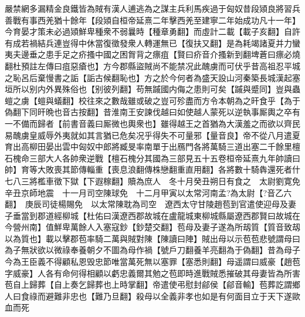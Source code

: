 嚴禁網多漏精金良鐵皆為賊有漢人逋逃為之謀主兵利馬疾過于匈奴昔段熲良將習兵善戰有事西羌猶十餘年【段熲自桓帝延熹二年擊西羌至建寧二年始成功凡十一年】今育晏才策未必過熲鮮卑種衆不弱曩時【種章勇翻】而虛計二載【載子亥翻】自許有成若禍結兵連豈得中休當復徵發衆人轉運無已【復扶又翻】是為耗竭諸夏并力蠻夷夫邊垂之患手足之疥搔中國之困胷背之瘭疽【賢曰疥音介搔新到翻埤蒼曰瘭必燒翻杜預註左傳曰疽惡瘡也】方今郡縣盜賊尚不能禁况此醜虜而可伏乎昔高祖忍平城之恥呂后棄慢書之詬【詬古候翻恥也】方之於今何者為盛天設山河秦築長城漢起塞垣所以别内外異殊俗也【别彼列翻】苟無䠞國内侮之患則可矣【䠞與蹙同】豈與蟲螘之虜【螘與蟻翻】校往來之數哉雖或破之豈可殄盡而方令本朝為之旰食乎【為于偽翻下同旰晩也音古按翻】昔淮南王安諫伐越曰如使越人蒙死以逆執事厮輿之卒有一不備而歸者【前書音義曰厮微也輿衆也】雖得越王之首猶為大漢羞之而欲以齊民易醜虜皇威辱外夷就如其言猶已危矣况乎得失不可量邪【量音良】帝不從八月遣夏育出高柳田晏出雲中匈奴中郎將臧旻率南單于出鴈門各將萬騎三道出塞二千餘里檀石槐命三部大人各帥衆逆戰【檀石槐分其國為三部見五十五卷桓帝延熹九年帥讀曰帥】育等大敗喪其節傳輜重【喪息浪翻傳株戀翻重直用翻】各將數十騎犇還死者什七八三將檻車徵下獄【下遐稼翻】贖為庶人　冬十月癸丑朔日有食之　太尉劉寛免　辛丑京師地震　十一月司空陳球免　十二月甲寅以太常河南孟?為太尉【?音乙六翻】　庚辰司徒楊賜免　以太常陳耽為司空　遼西太守甘陵趙苞到官遣使迎母及妻子垂當到郡道經柳城【杜佑曰漢遼西郡故城在盧龍城東柳城縣屬遼西郡賢曰故城在今營州南】值鮮卑萬餘人入塞寇鈔【鈔楚交翻】苞母及妻子遂為所刼質【質音致刼以為質也】載以擊郡苞率騎二萬與賊對陳【陳讀曰陣】賊出母以示苞苞悲號謂母曰為子無狀欲以微祿奉養朝夕不圖為母作禍【號戶刀翻養羊亮翻為于偽翻】昔為母子今為王臣義不得顧私恩毁忠節唯當萬死無以塞罪【塞悉則翻】母遥謂曰威豪【趙苞字威豪】人各有命何得相顧以虧忠義爾其勉之苞即時進戰賊悉摧破其母妻皆為所害苞自上歸葬【自上奏乞歸葬也上時掌翻】帝遣使弔慰封鄃侯【鄃音輸】苞葬訖謂鄉人曰食祿而避難非忠也【難乃旦翻】殺母以全義非孝也如是有何面目立于天下遂歐血而死

